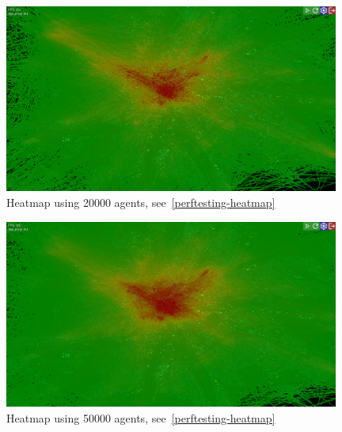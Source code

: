 \begin{figure}[!h]
    \centering
    \includegraphics[width=110mm, keepaspectratio]{images/heatmap_20000.png}
    \caption{Heatmap using 20000 agents, see~\ref{perftesting-heatmap}}
\end{figure}
\begin{figure}[!h]
    \centering
    \includegraphics[width=110mm, keepaspectratio]{images/heatmap_50000.png}
    \caption{Heatmap using 50000 agents, see~\ref{perftesting-heatmap}}
\end{figure}

